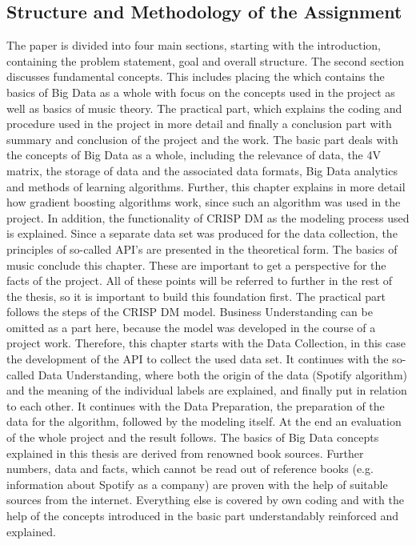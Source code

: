 \subsection{Structure and Methodology of the Assignment}
The paper is divided into four main sections, starting with the introduction, containing the problem statement, goal and overall structure.
The second section discusses fundamental concepts. This includes placing the 
which contains the basics of Big Data as a whole with focus on the concepts used in the project as well as basics of music theory. 
The practical part, which explains the coding and procedure used in the project in more detail and finally
a conclusion part with summary and conclusion of the project and the work. 
The basic part deals with the concepts of Big Data as a whole, including the relevance of data, the 4V matrix, the storage of data and the associated data formats, 
Big Data analytics and methods of learning algorithms. Further, this chapter explains in more detail how gradient boosting algorithms work, 
since such an algorithm was used in the project. In addition, the functionality of CRISP DM as the modeling process used is explained. 
Since a separate data set was produced for the data collection, the principles of so-called API's are presented in the theoretical form. 
The basics of music conclude this chapter. These are important to get a perspective for the facts of the project. 
All of these points will be referred to further in the rest of the thesis, so it is important to build this foundation first.
The practical part follows the steps of the CRISP DM model. Business Understanding can be omitted as a part here, because the model was developed in the course of a project work. 
Therefore, this chapter starts with the Data Collection, in this case the development of the API to collect the used data set. 
It continues with the so-called Data Understanding, where both the origin of the data (Spotify algorithm) and the meaning of the individual labels are explained, 
and finally put in relation to each other. It continues with the Data Preparation, the preparation of the data for the algorithm, followed by the modeling itself. 
At the end an evaluation of the whole project and the result follows.
The basics of Big Data concepts explained in this thesis are derived from renowned book sources. 
Further numbers, data and facts, which cannot be read out of reference books (e.g. information about Spotify as a company) 
are proven with the help of suitable sources from the internet. Everything else is covered by own coding and with the help of the concepts introduced in the basic part 
understandably reinforced and explained. 
